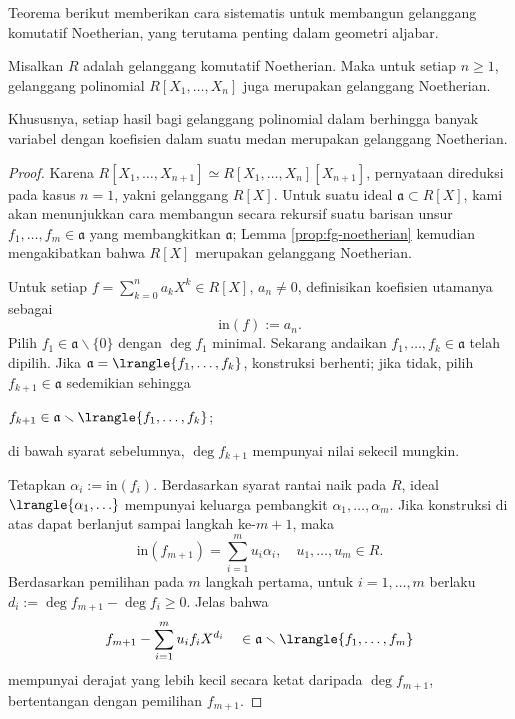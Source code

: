 Teorema berikut memberikan cara sistematis untuk membangun gelanggang komutatif Noetherian, yang terutama penting dalam geometri aljabar.
\begin{theorem}
	Misalkan $R$ adalah gelanggang komutatif Noetherian. Maka untuk setiap $n \geq 1$, gelanggang polinomial $R[X_1, \ldots, X_n]$ juga merupakan gelanggang Noetherian.
\end{theorem}
Khususnya, setiap hasil bagi gelanggang polinomial dalam berhingga banyak variabel dengan koefisien dalam suatu medan merupakan gelanggang Noetherian.
\begin{proof}
	Karena $R[X_1, \ldots, X_{n+1}] \simeq R[X_1, \ldots, X_n][X_{n+1}]$, pernyataan direduksi pada kasus $n=1$, yakni gelanggang $R[X]$. Untuk suatu ideal $\mathfrak{a} \subset R[X]$, kami akan menunjukkan cara membangun secara rekursif suatu barisan unsur $f_1, \ldots, f_m \in \mathfrak{a}$ yang membangkitkan $\mathfrak{a}$; Lemma \ref{prop:fg-noetherian} kemudian mengakibatkan bahwa $R[X]$ merupakan gelanggang Noetherian.

	Untuk setiap $f = \sum_{k=0}^n a_k X^k \in R[X]$, $a_n \neq 0$, definisikan koefisien utamanya sebagai
	\[ \text{in}(f) := a_n. \]
	Pilih $f_1 \in \mathfrak{a} \smallsetminus \{0\}$ dengan $\deg f_1$ minimal. Sekarang andaikan $f_1, \ldots, f_k \in \mathfrak{a}$ telah dipilih. Jika $\mathfrak{a} = \lrangle{f_1, \ldots, f_k}$, konstruksi berhenti; jika tidak, pilih $f_{k+1} \in \mathfrak{a}$ sedemikian sehingga
	\begin{inparaenum}[(i)]
		\item $f_{k+1} \in \mathfrak{a} \smallsetminus \lrangle{f_1, \ldots, f_k}$;
		\item di bawah syarat sebelumnya, $\deg f_{k+1}$ mempunyai nilai sekecil mungkin.
	\end{inparaenum}
	Tetapkan $\alpha_i := \text{in}(f_i)$. Berdasarkan syarat rantai naik pada $R$, ideal $\lrangle{\alpha_1, \ldots}$ mempunyai keluarga pembangkit $\alpha_1, \ldots, \alpha_m$. Jika konstruksi di atas dapat berlanjut sampai langkah ke-$m+1$, maka
	\[ \text{in}(f_{m+1}) = \sum_{i=1}^m u_i \alpha_i, \quad u_1, \ldots, u_m \in R. \]
	Berdasarkan pemilihan pada $m$ langkah pertama, untuk $i = 1, \ldots, m$ berlaku $d_i := \deg f_{m+1} - \deg f_i \geq 0$. Jelas bahwa
	\[ f_{m+1} - \sum_{i=1}^m u_i f_i X^{d_i} \quad \in \mathfrak{a} \smallsetminus \lrangle{f_1, \ldots, f_m} \]
	mempunyai derajat yang lebih kecil secara ketat daripada $\deg f_{m+1}$, bertentangan dengan pemilihan $f_{m+1}$.
\end{proof}

